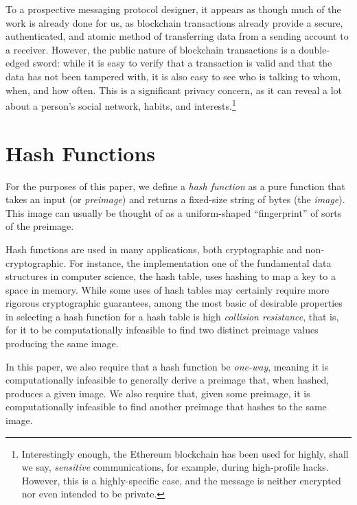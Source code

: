 To a prospective messaging protocol designer, it appears as though much of the work is already done for us, as blockchain transactions already provide a secure, authenticated, and atomic method of transferring data from a sending account to a receiver. However, the public nature of blockchain transactions is a double-edged sword: while it is easy to verify that a transaction is valid and that the data has not been tampered with, it is also easy to see who is talking to whom, when, and how often. This is a significant privacy concern, as it can reveal a lot about a person's social network, habits, and interests.\footnote{Interestingly enough, the Ethereum blockchain has been used for highly, shall we say, \emph{sensitive} communications, for example, during high-profile hacks. \parencite{etherscanio_hackermessage_2023} However, this is a highly-specific case, and the message is neither encrypted nor even intended to be private.}

\section{Hash Functions}\label{hash-functions}

For the purposes of this paper, we define a \emph{hash function} as a pure function that takes an input (or \emph{preimage}) and returns a fixed-size string of bytes (the \emph{image}). This image can usually be thought of as a uniform-shaped ``fingerprint'' of sorts of the preimage.

Hash functions are used in many applications, both cryptographic and non-cryptographic. For instance, the implementation one of the fundamental data structures in computer science, the hash table, uses hashing to map a key to a space in memory. While some uses of hash tables may certainly require more rigorous cryptographic guarantees, among the most basic of desirable properties in selecting a hash function for a hash table is high \emph{collision resistance}, that is, for it to be computationally infeasible to find two distinct preimage values producing the same image.

In this paper, we also require that a hash function be \emph{one-way}, meaning it is computationally infeasible to generally derive a preimage that, when hashed, produces a given image. We also require that, given some preimage, it is computationally infeasible to find another preimage that hashes to the same image.
